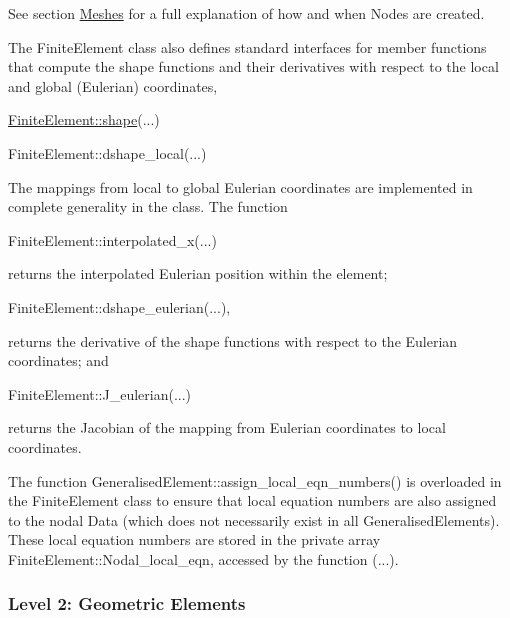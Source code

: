 \begin{DoxyItemize}
\begin{DoxyItemize}
See section \hyperlink{index_meshes}{Meshes} for a full explanation of how and when {\ttfamily Nodes} are created.
\item The {\ttfamily Finite\+Element} class also defines standard interfaces for member functions that compute the shape functions and their derivatives with respect to the local and global (Eulerian) coordinates, 
\begin{DoxyCode}
\hyperlink{namespaceoomph_1_1OneDimLagrange_a117f8b892dc89989ecdad99ff261e120}{FiniteElement::shape}(...) 
\end{DoxyCode}
 
\begin{DoxyCode}
FiniteElement::dshape\_local(...) 
\end{DoxyCode}
 The mappings from local to global Eulerian coordinates are implemented in complete generality in the class. The function 
\begin{DoxyCode}
FiniteElement::interpolated\_x(...) 
\end{DoxyCode}
 returns the interpolated Eulerian position within the element; 
\begin{DoxyCode}
FiniteElement::dshape\_eulerian(...), 
\end{DoxyCode}
 returns the derivative of the shape functions with respect to the Eulerian coordinates; and 
\begin{DoxyCode}
FiniteElement::J\_eulerian(...) 
\end{DoxyCode}
 returns the Jacobian of the mapping from Eulerian coordinates to local coordinates.
\item The function {\ttfamily Generalised\+Element\+::assign\+\_\+local\+\_\+eqn\+\_\+numbers()} is overloaded in the {\ttfamily Finite\+Element} class to ensure that local equation numbers are also assigned to the nodal {\ttfamily Data} (which does not necessarily exist in all {\ttfamily Generalised\+Elements}). These local equation numbers are stored in the private array {\ttfamily Finite\+Element\+::\+Nodal\+\_\+local\+\_\+eqn}, accessed by the function {(}...).
\end{DoxyItemize}
\end{DoxyItemize}\hypertarget{index_Geometric_Element}{}\subsubsection{Level 2\+: Geometric Elements}\label{index_Geometric_Element}
